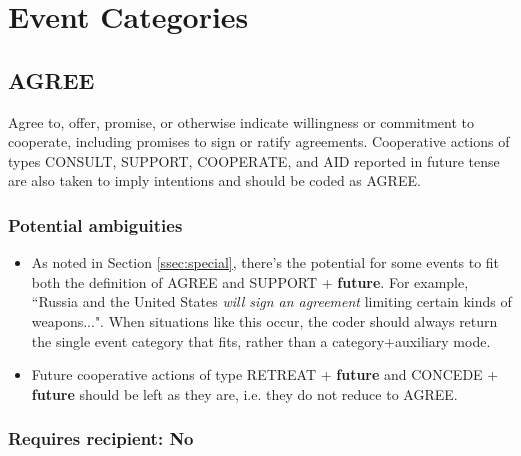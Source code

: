 \documentclass[11pt]{report}
\newcommand{\plcat}[1]{\textsf{#1}}
\newcommand{\plcon}[1]{\textbf{#1}}
\begin{document}
\chapter{Event Categories}

\section{AGREE}


Agree to, offer, promise, or otherwise indicate willingness or commitment to cooperate, including promises to sign or ratify agreements.  Cooperative actions of types \plcat{CONSULT}, \plcat{SUPPORT}, \plcat{COOPERATE}, and \plcat{AID} reported in future tense are also taken to imply intentions and should be coded as \plcat{AGREE}.


\subsection{Potential ambiguities}

\begin{itemize}
\item As noted in Section \ref{ssec:special}, there's the potential for some events to fit both the definition of \plcat{AGREE} and \plcat{SUPPORT} + \plcon{future}. For example, ``Russia and the United States \emph{will sign an agreement} limiting certain kinds of weapons...". When situations like this occur, the coder should always return the single event category that fits, rather than a category+auxiliary mode.
\item Future cooperative actions of type \plcat{RETREAT} + \plcon{future} and \plcat{CONCEDE} + \plcon{future} should be left as they are, i.e. they do not reduce to \plcat{AGREE}.
\end{itemize}

\subsection{Requires recipient: No}
\end{document}
